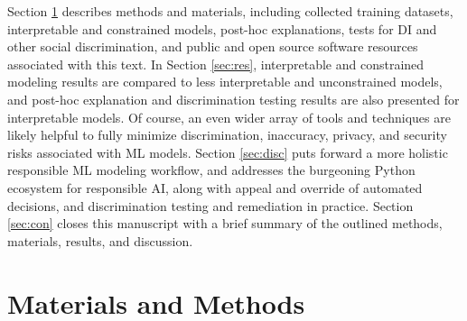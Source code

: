 \documentclass[information,article,submit,moreauthors,pdftex]{definitions/mdpi}
\begin{document}
Section \ref{sec:m_and_m} describes methods and materials, including collected training datasets, interpretable and constrained models, post-hoc explanations, tests for DI and other social discrimination, and public and open source software resources associated with this text. In Section \ref{sec:res}, interpretable and constrained modeling results are compared to less interpretable and unconstrained models, and post-hoc explanation and discrimination testing results are also presented for interpretable models. Of course, an even wider array of tools and techniques are likely helpful to fully minimize discrimination, inaccuracy, privacy, and security risks associated with ML models. Section \ref{sec:disc} puts forward a more holistic responsible ML modeling workflow, and addresses the burgeoning Python ecosystem for responsible AI, along with appeal and override of automated decisions, and discrimination testing and remediation in practice. Section \ref{sec:con} closes this manuscript with a brief summary of the outlined methods, materials, results, and discussion.

\section{Materials and Methods}\label{sec:m_and_m}
\end{document}
